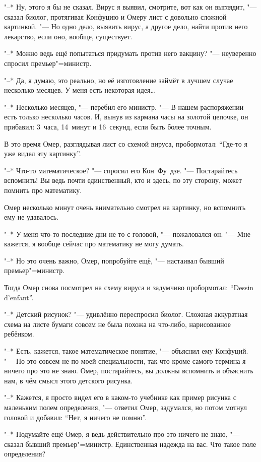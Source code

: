 "--* Ну, этого я бы не сказал.
Вирус я выявил, смотрите, вот как он выглядит, "--- сказал биолог, протягивая
Конфуцию и Омеру лист с довольно сложной картинкой.
"--- Но одно дело, выявить вирус, а другое дело, найти против него лекарство,
если оно, вообще, существует.

"--* Можно ведь ещё попытаться придумать против него вакцину? "--- неуверенно
спросил премьер"=министр.

"--* Да, я думаю, это реально, но её изготовление займёт в лучшем случае
несколько месяцев.
У меня есть некоторая идея\ldots

"--* Несколько месяцев, "--- перебил его министр.
"--- В нашем распоряжении есть только несколько часов.
И, вынув из кармана часы на золотой цепочке, он прибавил: 3~часа, 14~минут и
16~секунд, если быть более точным.

В это время Омер, разглядывая лист со схемой вируса, пробормотал:
\enquote{Где-то я уже видел эту картинку}.

"--* Что-то математическое? "--- спросил его Кон~Фу~дзе.
"--- Постарайтесь вспомнить!
Вы ведь почти единственный, кто и здесь, по эту сторону, может помнить про
математику.

Омер несколько минут очень внимательно смотрел на картинку, но вспомнить ему не
удавалось.

"--* У меня что-то последние дни не то с головой, "--- пожаловался он.
"--- Мне кажется, я вообще сейчас про математику не могу думать.

"--* Но это очень важно, Омер, попробуйте ещё, "--- настаивал бывший
премьер"=министр.

Тогда Омер снова посмотрел на схему вируса и задумчиво пробормотал:
\enquote{\foreignlanguage{french}{Dessin d'enfant}}.

"--* Детский рисунок? "--- удивлённо переспросил биолог.
Сложная аккуратная схема на листе бумаги совсем не была похожа на что-либо,
нарисованное ребёнком.

"--* Есть, кажется, такое математическое понятие, "--- объяснил ему Конфуций.
"--- Но это совсем не по моей специальности, так что кроме самого термина я
ничего про это не знаю.
Омер, постарайтесь, вы должны вспомнить и объяснить нам, в чём смысл этого
детского рисунка.

"--* Кажется, я просто видел его в каком-то учебнике как пример рисунка с
маленьким полем определения, "--- ответил Омер, задумался, но потом мотнул
головой и добавил: \enquote{Нет, я ничего не помню}.

"--* Подумайте ещё Омер, я ведь действительно про это ничего не знаю, "---
сказал бывший премьер"=министр.
Единственная надежда на вас.
Что такое поле определения?

